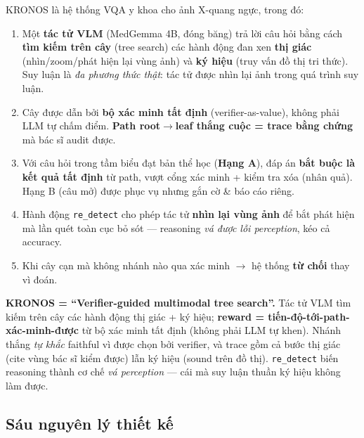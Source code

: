 \documentclass[11pt,a4paper]{article}
\begin{document}
KRONOS là hệ thống VQA y khoa cho ảnh X-quang ngực, trong đó:
\begin{enumerate}[leftmargin=1.5em]
  \item Một \textbf{tác tử VLM} (MedGemma 4B, đóng băng) trả lời câu hỏi bằng cách \textbf{tìm kiếm trên cây} (tree search) các hành động đan xen \textbf{thị giác} (nhìn/zoom/phát hiện lại vùng ảnh) và \textbf{ký hiệu} (truy vấn đồ thị tri thức). Suy luận là \emph{đa phương thức thật}: tác tử được nhìn lại ảnh trong quá trình suy luận.
  \item Cây được dẫn bởi \textbf{bộ xác minh tất định} (verifier-as-value), không phải LLM tự chấm điểm. \textbf{Path root$\to$leaf thắng cuộc = trace bằng chứng} mà bác sĩ audit được.
  \item Với câu hỏi trong tầm biểu đạt bản thể học (\textbf{Hạng A}), đáp án \textbf{bắt buộc là kết quả tất định} từ path, vượt cổng xác minh + kiểm tra xóa (nhân quả). Hạng B (câu mở) được phục vụ nhưng gắn cờ \& báo cáo riêng.
  \item Hành động \texttt{re\_detect} cho phép tác tử \textbf{nhìn lại vùng ảnh} để bắt phát hiện mà lần quét toàn cục bỏ sót --- reasoning \emph{vá được lỗi perception}, kéo cả accuracy.
  \item Khi cây cạn mà không nhánh nào qua xác minh $\to$ hệ thống \textbf{từ chối} thay vì đoán.
\end{enumerate}

\begin{keyinsight}
\textbf{KRONOS = ``Verifier-guided multimodal tree search''.} Tác tử VLM tìm kiếm trên cây các hành động thị giác + ký hiệu; \textbf{reward = tiến-độ-tới-path-xác-minh-được} từ bộ xác minh tất định (không phải LLM tự khen). Nhánh thắng \emph{tự khắc} faithful vì được chọn bởi verifier, và trace gồm cả bước thị giác (cite vùng bác sĩ kiểm được) lẫn ký hiệu (sound trên đồ thị). \texttt{re\_detect} biến reasoning thành cơ chế \emph{vá perception} --- cái mà suy luận thuần ký hiệu không làm được.
\end{keyinsight}

\subsection{Sáu nguyên lý thiết kế}
\end{document}
